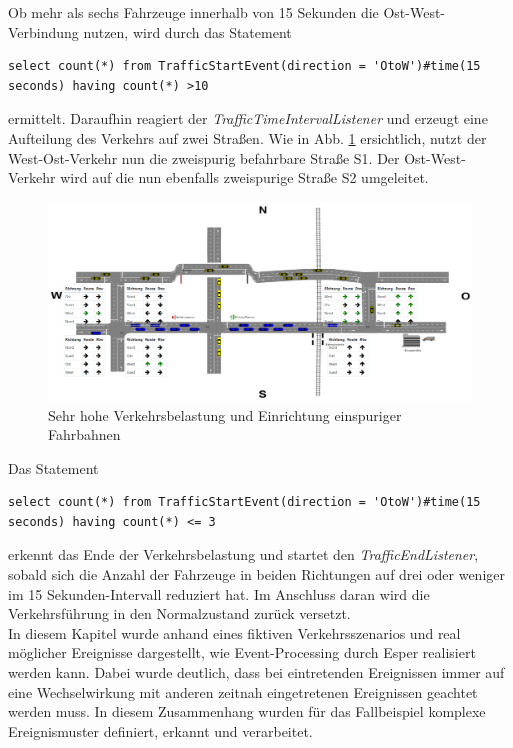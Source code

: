 Ob mehr als sechs Fahrzeuge innerhalb von 15 Sekunden die Ost-West-Verbindung nutzen, wird durch das Statement
\begin{lstlisting}
select count(*) from TrafficStartEvent(direction = 'OtoW')#time(15 seconds) having count(*) >10
\end{lstlisting}
ermittelt. Daraufhin reagiert der \textit{TrafficTimeIntervalListener} und erzeugt eine Aufteilung des Verkehrs auf zwei Straßen. Wie in Abb. \ref{fig11} ersichtlich, nutzt der West-Ost-Verkehr nun die zweispurig befahrbare Straße S1. Der Ost-West-Verkehr wird auf die nun ebenfalls zweispurige Straße S2 umgeleitet. 

\begin{figure}[ht]
	\includegraphics[width=\textwidth]{images/TrafficVeryHigh.png}
	\caption{Sehr hohe Verkehrsbelastung und Einrichtung einspuriger Fahrbahnen}
	\label{fig11}
\end{figure}

Das Statement 

\begin{lstlisting}
select count(*) from TrafficStartEvent(direction = 'OtoW')#time(15 seconds) having count(*) <= 3
\end{lstlisting}

erkennt das Ende der Verkehrsbelastung und startet den \textit{TrafficEndListener}, sobald sich die Anzahl der Fahrzeuge in beiden Richtungen auf drei oder weniger im 15 Sekunden-Intervall reduziert hat. Im Anschluss daran wird die Verkehrsführung in den Normalzustand zurück versetzt.\\

In diesem Kapitel wurde anhand eines fiktiven Verkehrsszenarios und real möglicher Ereignisse dargestellt, wie Event-Processing durch Esper realisiert werden kann. Dabei wurde deutlich, dass bei eintretenden Ereignissen immer auf eine Wechselwirkung mit anderen zeitnah eingetretenen Ereignissen geachtet werden muss. In diesem Zusammenhang wurden für das Fallbeispiel komplexe Ereignismuster definiert, erkannt und verarbeitet.

\clearpage
